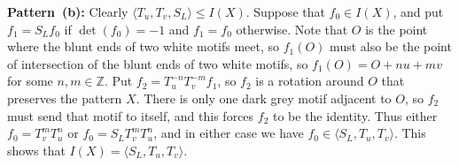 \documentclass{amsart}
\renewcommand{\:}{\colon}
\newcommand{\ip}[1]{\langle #1\rangle}
\newcommand{\Z}{\mathbb{Z}}
\theoremstyle{definition}
\newenvironment{solution}{{\noindent\bf Solution:}}{}
\begin{document}
\begin{solution}
 {\bf Pattern~(b):} Clearly $\ip{T_u,T_v,S_L}\leq I(X)$.  Suppose that
 $f_0\in I(X)$, and put $f_1=S_Lf_0$ if $\det(f_0)=-1$ and $f_1=f_0$
 otherwise.  Note that $O$ is the point where the blunt ends of two
 white motifs meet, so $f_1(O)$ must also be the point of intersection
 of the blunt ends of two white motifs, so $f_1(O)=O+nu+mv$ for some
 $n,m\in\Z$.  Put $f_2=T_u^{-n}T_v^{-m}f_1$, so $f_2$ is a rotation
 around $O$ that preserves the pattern $X$.  There is only one dark
 grey motif adjacent to $O$, so $f_2$ must send that motif to itself,
 and this forces $f_2$ to be the identity.  Thus either
 $f_0=T_v^mT_u^n$ or $f_0=S_LT_v^mT_u^n$, and in either case we have
 $f_0\in\ip{S_L,T_u,T_v}$.  This shows that $I(X)=\ip{S_L,T_u,T_v}$.
 \begin{center}
 \end{center}


\end{solution}
\end{document}
